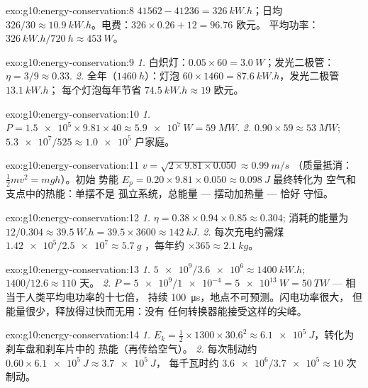 \begin{solution}{exo:g10:energy-conservation:8}
$41562 - 41236 = \qty{326}{kW.h}$；日均 $326/30 \approx
\qty{10.9}{kW.h}$。电费：$326 \times 0.26 + 12 = 96.76$ 欧元。
平均功率：$\qty{326}{kW.h}/\qty{720}{h} \approx \qty{453}{W}$。
\end{solution}

\begin{solution}{exo:g10:energy-conservation:9}
\emph{1.} 白炽灯：$0.05 \times 60 = \qty{3.0}{W}$；发光二极管：
$\eta = 3/9 \approx 0.33$.
\emph{2.} 全年（$\qty{1460}{h}$）：灯泡 
$60 \times 1460 = \qty{87.6}{kW.h}$，发光二极管 $\qty{13.1}{kW.h}$；
每个灯泡每年节省 $\qty{74.5}{kW.h} \approx 19$ 欧元。
\end{solution}

\begin{solution}{exo:g10:energy-conservation:10}
\emph{1.} $P = \num{1.5e5} \times 9.81 \times 40 \approx
\qty{5.9e7}{W} = \qty{59}{MW}$.
\emph{2.} $0.90 \times 59 \approx \qty{53}{MW}$;
$\num{5.3e7}/525 \approx \num{1.0e5}$ 户家庭。
\end{solution}

\begin{solution}{exo:g10:energy-conservation:11}
$v = \sqrt{2 \times 9.81 \times 0.050} \approx \qty{0.99}{m/s}$
（质量抵消：$\tfrac12 m v^2 = mgh$）。初始
势能 $E_p = 0.20 \times 9.81 \times 0.050 \approx \qty{0.098}{J}$ 最终转化为
空气和支点中的热能：单摆不是
孤立系统，总能量 --- 摆动加热量 --- 恰好
守恒。
\end{solution}

\begin{solution}{exo:g10:energy-conservation:12}
\emph{1.} $\eta = 0.38 \times 0.94 \times 0.85 \approx 0.304$;
消耗的能量为 $12/0.304 \approx \qty{39.5}{W.h}
= 39.5 \times 3600 \approx \qty{142}{kJ}$.
\emph{2.} 每次充电约需煤 $\num{1.42e5}/\num{2.5e7} \approx \qty{5.7}{g}$
，每年约 $\times 365 \approx \qty{2.1}{kg}$。
\end{solution}

\begin{solution}{exo:g10:energy-conservation:13}
\emph{1.} $\num{5e9}/\num{3.6e6} \approx \qty{1400}{kW.h}$;
$1400/12.6 \approx 110$ 天。
\emph{2.} $P = \num{5e9}/\num{1e-4} = \qty{5e13}{W} = \qty{50}{TW}$
--- 相当于人类平均电功率的十七倍，
持续 \qty{100}{\micro s}，地点不可预测。闪电功率很大，
但能量很少，释放得过快而无用：没有
任何转换器能接受这样的尖峰。
\end{solution}

\begin{solution}{exo:g10:energy-conservation:14}
\emph{1.} $E_k = \tfrac12 \times 1300 \times 30.6^2 \approx
\qty{6.1e5}{J}$，转化为刹车盘和刹车片中的
热能（再传给空气）。
\emph{2.} 每次制动约 $0.60 \times \qty{6.1e5}{J} \approx \qty{3.7e5}{J}$，
每千瓦时约 $\num{3.6e6}/\num{3.7e5} \approx 10$ 次制动。
\end{solution}

